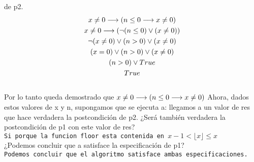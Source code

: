 \documentclass[10pt,a4paper]{article}
\begin{document}
de p2.\\
{\color{red}
\begin{equation*}
    \begin{gathered}
        x\not = 0 \longrightarrow (n\leq 0 \longrightarrow x \not = 0)\\
        x\not = 0 \longrightarrow (\lnot (n\leq 0) \lor (x \not = 0))\\
        \lnot(x\not = 0) \lor (n>0) \lor (x \not = 0)\\
        (x=0) \lor (n>0) \lor (x \not = 0)\\
        (n>0) \lor True\\
        True
    \end{gathered}
\end{equation*}
\\Por lo tanto queda demostrado que $x\not = 0 \longrightarrow (n\leq 0 \longrightarrow x \not = 0)$
}
\salto{\baselineskip}
Ahora, dados estos valores de x y n, supongamos que se ejecuta a: llegamos a un valor de res que hace verdadera la
postcondición de p2. ¿Será también verdadera la postcondición de p1 con este valor de res?
\texttt{\color{red}\\Si porque la funcion floor esta contenida en $x-1<\lfloor x\rfloor \leq x$}
\\¿Podemos concluir que a satisface la especiﬁcación de p1?
\texttt{\color{red}\\Podemos concluir que el algoritmo satisface ambas especificaciones.}
\pagebreak
\end{document}
